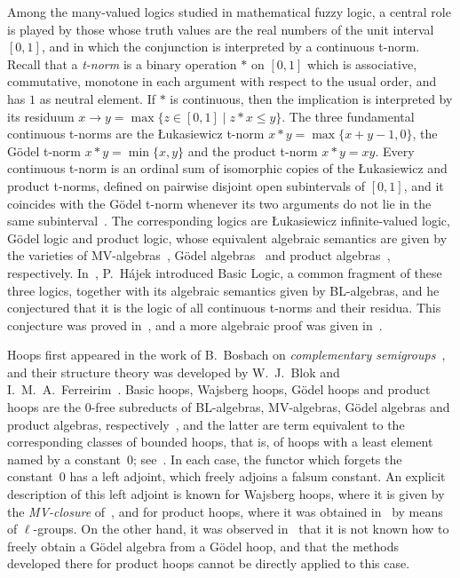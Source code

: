 \documentclass[reqno,a4paper]{amsart}
\theoremstyle{plain}
\theoremstyle{definition}
\theoremstyle{remark}
\numberwithin{equation}{section}
\begin{document}
Among the many-valued logics studied in mathematical fuzzy logic, a central role is played by those whose truth values are the real numbers of the unit interval $[0,1]$, and in which the conjunction is interpreted by a continuous t-norm. Recall that a \emph{t-norm} is a binary operation $\ast$ on $[0,1]$ which is associative, commutative, monotone in each argument with respect to the usual order, and has $1$ as neutral element. If $\ast$ is continuous, then the implication is interpreted by its residuum $x\to y=\max\{z\in[0,1]\mid z\ast x\leq y\}$. The three fundamental continuous t-norms are the \L{}ukasiewicz t-norm $x\ast y=\max\{x+y-1,0\}$, the G\"odel t-norm $x\ast y=\min\{x,y\}$ and the product t-norm $x\ast y=xy$. Every continuous t-norm is an ordinal sum of isomorphic copies of the \L{}ukasiewicz and product t-norms, defined on pairwise disjoint open subintervals of $[0,1]$, and it coincides with the G\"odel t-norm whenever its two arguments do not lie in the same subinterval~\cite{Hajek}. The corresponding logics are \L{}ukasiewicz infinite-valued logic, G\"odel logic and product logic, whose equivalent algebraic semantics are given by the varieties of MV-algebras~\cite{Chang}, G\"odel algebras~\cite{Hajek} and product algebras~\cite{HGE}, respectively. In~\cite{Hajek}, P.~H\'ajek introduced Basic Logic, a common fragment of these three logics, together with its algebraic semantics given by BL-algebras, and he conjectured that it is the logic of all continuous t-norms and their residua. This conjecture was proved in~\cite{CEGT}, and a more algebraic proof was given in~\cite{AFM}.

Hoops first appeared in the work of B.~Bosbach on \emph{complementary semigroups}~\cite{Bosbach}, and their structure theory was developed by W.~J.~Blok and I.~M.~A.~Ferreirim~\cite{BlokFerreirim}. Basic hoops, Wajsberg hoops, G\"odel hoops and product hoops are the $0$-free subreducts of BL-algebras, MV-algebras, G\"odel algebras and product algebras, respectively~\cite{AFM,GMU}, and the latter are term equivalent to the corresponding classes of bounded hoops, that is, of hoops with a least element named by a constant~$0$; see~\cite{AFM,Hajek}. In each case, the functor which forgets the constant~$0$ has a left adjoint, which freely adjoins a falsum constant. An explicit description of this left adjoint is known for Wajsberg hoops, where it is given by the \emph{MV-closure} of~\cite{ACD}, and for product hoops, where it was obtained in~\cite{GMU} by means of $\ell$-groups. On the other hand, it was observed in~\cite[Section~6]{GMU} that it is not known how to freely obtain a G\"odel algebra from a G\"odel hoop, and that the methods developed there for product hoops cannot be directly applied to this case.
\end{document}
